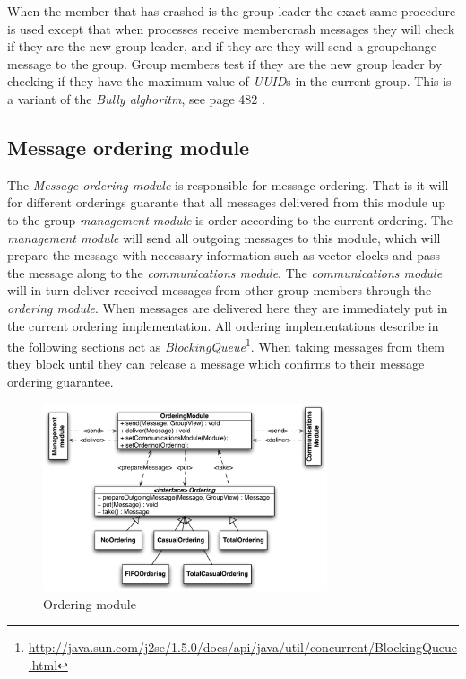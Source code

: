 \documentclass[titlepage, twocolumn, a4paper, 10pt]{article}
\begin{document}
When the member that has crashed is the group leader the exact same procedure is used except that when processes receive membercrash messages they will check if they are the new group leader, and if they are they will send a groupchange message to the group. Group members test if they are the new group leader by checking if they have the maximum value of \textit{UUID}s in the current group. This is a variant of the \textit{Bully alghoritm}, see page 482 \cite{book:dist-syst}.


\subsection{Message ordering module}\label{sec:message-ordering-module}
The \textit{Message ordering module} is responsible for message
ordering. That is it will for different orderings guarante that all
messages delivered from this module up to the group \textit{management
  module} is order according to the current ordering. The
\textit{management module} will send all outgoing messages to this
module, which will prepare the message with necessary information such
as vector-clocks and pass the message along to the
\textit{communications module}. The \textit{communications module}
will in turn deliver received messages from other group members
through the \textit{ordering module}. When messages are delivered here
they are immediately put in the current ordering implementation. All
ordering implementations describe in the following sections act as
\textit{BlockingQueue}\footnote{\url{http://java.sun.com/j2se/1.5.0/docs/api/java/util/concurrent/BlockingQueue.html}}.
When taking messages from them they block until they can release a
message which confirms to their message ordering guarantee.

\begin{figure}[!thb]
  \centering
  \includegraphics[width=3.3in]{images/Ordering.pdf}
  \caption{Ordering module}
  \label{fig:images/ordering}
\end{figure}
\end{document}
